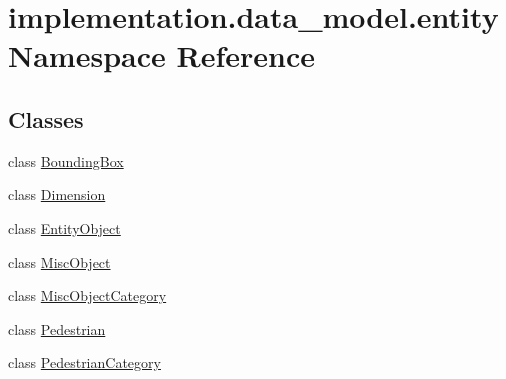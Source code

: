 \hypertarget{namespaceimplementation_1_1data__model_1_1entity}{}\section{implementation.\+data\+\_\+model.\+entity Namespace Reference}
\label{namespaceimplementation_1_1data__model_1_1entity}
\subsection*{Classes}
\begin{DoxyCompactItemize}
\item 
class \hyperlink{classimplementation_1_1data__model_1_1entity_1_1_bounding_box}{Bounding\+Box}
\item 
class \hyperlink{classimplementation_1_1data__model_1_1entity_1_1_dimension}{Dimension}
\item 
class \hyperlink{classimplementation_1_1data__model_1_1entity_1_1_entity_object}{Entity\+Object}
\item 
class \hyperlink{classimplementation_1_1data__model_1_1entity_1_1_misc_object}{Misc\+Object}
\item 
class \hyperlink{classimplementation_1_1data__model_1_1entity_1_1_misc_object_category}{Misc\+Object\+Category}
\item 
class \hyperlink{classimplementation_1_1data__model_1_1entity_1_1_pedestrian}{Pedestrian}
\item 
class \hyperlink{classimplementation_1_1data__model_1_1entity_1_1_pedestrian_category}{Pedestrian\+Category}
\end{DoxyCompactItemize}
